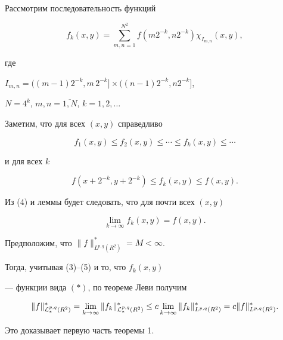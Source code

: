 Рассмотрим последовательность функций


$$


f_k(x,y) = \sum_{m,n=1}^{N^2} f(m2^{-k},n2^{-k})


\chi_{I_{m,n}}(x,y),


$$


где


$I_{m,n} = ((m-1)2^{-k},m\,2^{-k}] \times ((n-1)2^{-k},n2^{-k}]$,


$N=4^k$, $m,n=\overline{1,N}$, $k=1,2,\dotsc$


Заметим, что для всех $(x,y)$ справедливо


\begin{equation}


f_1(x,y) \le  f_2(x,y) \le \dotsb \le


f_k(x,y) \le \dotsb


\end{equation}


и для всех $k$


\begin{equation}


f(x+2^{-k},y+2^{-k}) \le f_k(x,y) \le f(x,y).


\end{equation}


Из (4) и леммы будет следовать, что для почти всех $(x,y)$


\begin{equation}


\lim_{k\to \infty} f_k(x,y) = f(x,y).


\end{equation}





Предположим, что $\|f\|_{L^{p,q}(R^2)}^*=M<\infty$.


Тогда, учитывая (3)--(5) и то, что $f_k(x,y)$


--- функции вида $(*)$, по теореме Леви получим


$$


\|f\|_{{\cal L}_*^{p,q}(R^2)}^* =


\lim_{k \to \infty}


\|f_k\|_{{\cal L}_*^{p,q}(R^2)}^* \le


c \lim_{k \to \infty} \|f_k\|_{L^{p,q}(R^2)}^* =


c \|f\|_{L^{p,q}(R^2)}^*.


$$


Это доказывает первую часть теоремы 1.





